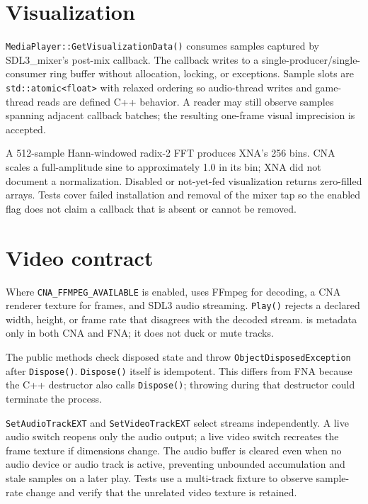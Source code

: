 \section{Visualization}

\texttt{MediaPlayer::GetVisualizationData()} consumes samples captured by SDL3\_mixer's
post-mix callback. The callback writes to a single-producer/single-consumer ring buffer without
allocation, locking, or exceptions. Sample slots are \texttt{std::atomic<float>} with relaxed
ordering so audio-thread writes and game-thread reads are defined C++ behavior. A reader may
still observe samples spanning adjacent callback batches; the resulting one-frame visual
imprecision is accepted.

A 512-sample Hann-windowed radix-2 FFT produces XNA's 256 bins. CNA scales a full-amplitude sine
to approximately 1.0 in its bin; XNA did not document a normalization. Disabled or not-yet-fed
visualization returns zero-filled arrays. Tests cover failed installation and removal of the
mixer tap so the enabled flag does not claim a callback that is absent or cannot be removed.

\section{Video contract}

Where \texttt{CNA\_FFMPEG\_AVAILABLE} is enabled,  uses FFmpeg for
decoding, a CNA renderer texture for frames, and SDL3 audio streaming. \texttt{Play()} rejects
a declared width, height, or frame rate that disagrees with the decoded stream.
 is metadata only in both CNA and FNA; it does not duck or mute
tracks.

The public methods check disposed state and throw \texttt{ObjectDisposedException} after
\texttt{Dispose()}. \texttt{Dispose()} itself is idempotent. This differs from FNA because the
C++ destructor also calls \texttt{Dispose()}; throwing during that destructor could terminate
the process.

\texttt{SetAudioTrackEXT} and \texttt{SetVideoTrackEXT} select streams independently. A live
audio switch reopens only the audio output; a live video switch recreates the frame texture if
dimensions change. The audio buffer is cleared even when no audio device or audio track is
active, preventing unbounded accumulation and stale samples on a later play. Tests use a
multi-track fixture to observe sample-rate change and verify that the unrelated video texture
is retained.

